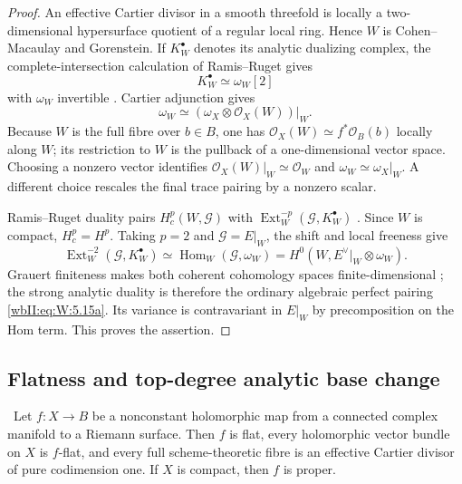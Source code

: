 \begin{proof}
An effective Cartier divisor in a smooth threefold is locally a
two-dimensional hypersurface quotient of a regular local ring.  Hence $W$
is Cohen--Macaulay and Gorenstein.  If $K_W^\bullet$ denotes its analytic
dualizing complex, the complete-intersection calculation of Ramis--Ruget
gives
\[
 K_W^\bullet\simeq\omega_W[2]
\]
with $\omega_W$ invertible
\cite[Proposition~2 and the complete-intersection calculation,
pp.~90--91]{RR70push}.  Cartier adjunction gives
\[
 \omega_W\simeq
 (\omega_X\otimes\mathcal O_X(W))|_W.
\]
Because $W$ is the full fibre over $b\in B$, one has
$\mathcal O_X(W)\simeq f^*\mathcal O_B(b)$ locally along $W$; its
restriction to $W$ is the pullback of a one-dimensional vector space.
Choosing a nonzero vector identifies
$\mathcal O_X(W)|_W\simeq\mathcal O_W$ and
$\omega_W\simeq\omega_X|_W$.  A different choice rescales the final trace
pairing by a nonzero scalar.

Ramis--Ruget duality pairs $H_c^p(W,\mathcal G)$ with
$\operatorname{Ext}^{-p}_W(\mathcal G,K_W^\bullet)$
\cite[Theorem~2, pp.~82--83]{RR70push}.  Since $W$ is compact,
$H_c^p=H^p$.  Taking $p=2$ and $\mathcal G=E|_W$, the shift and local
freeness give
\[
 \operatorname{Ext}^{-2}_W(\mathcal G,K_W^\bullet)
 \simeq\operatorname{Hom}_W(\mathcal G,\omega_W)
 =H^0(W,E^\vee|_W\otimes\omega_W).
\]
Grauert finiteness makes both coherent cohomology spaces finite-dimensional
\cite{Grauert1960D}; the strong analytic duality is therefore the ordinary
algebraic perfect pairing \eqref{wbII:eq:W:5.15a}.  Its variance is contravariant in $E|_W$
by precomposition on the Hom term.  This proves the assertion.
\end{proof}

\subsection{Flatness and top-degree analytic base change}

\begin{lemma}
\label{wbII:lem:curve-flatness}
\ Let $f:X\to B$ be a nonconstant holomorphic map from a connected
complex manifold to a Riemann surface.  Then $f$ is flat, every holomorphic
vector bundle on $X$ is $f$-flat, and every full scheme-theoretic fibre is an
effective Cartier divisor of pure codimension one.  If $X$ is compact, then
$f$ is proper.
\end{lemma}

